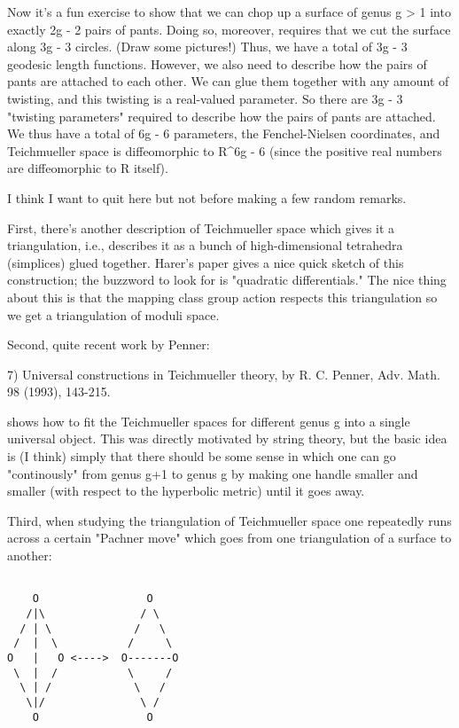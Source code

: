 Now it's a fun exercise to show that we can chop up a surface of genus g
> 1 into exactly 2g - 2 pairs of pants.  Doing so, moreover, requires
that we cut the surface along 3g - 3 circles.  (Draw some pictures!)  
Thus, we have a total of 3g - 3 geodesic length functions.  However, we
also need to describe how the pairs of pants are attached to each other.
We can glue them together with any amount of twisting, and this twisting
is a real-valued parameter.  So there are 3g - 3 "twisting parameters"
required to describe how the pairs of pants are attached.  We thus have
a total of 6g - 6 parameters, the Fenchel-Nielsen coordinates, and
Teichmueller space is diffeomorphic to R^{6g - 6} (since the positive
real numbers are diffeomorphic to R itself).  

I think I want to quit here but not before making a few random remarks.

First, there's another description of Teichmueller space which gives it
a triangulation, i.e., describes it as a bunch of high-dimensional
tetrahedra (simplices) glued together.  Harer's paper gives a nice quick
sketch of this construction; the buzzword to look for is "quadratic
differentials."  The nice thing about this is that the mapping class
group action respects this triangulation so we get a triangulation of
moduli space.  

Second, quite recent work by Penner:

7) Universal constructions in Teichmueller theory, by R. C. Penner, Adv.
Math. 98 (1993), 143-215.

shows how to fit the Teichmueller spaces for different genus g into a
single universal object.  This was directly motivated by string theory,
but the basic idea is (I think) simply that there should be some sense in which
one can go "continously" from genus g+1 to genus g by making one handle
smaller and smaller (with respect to the hyperbolic metric) until it
goes away.  

Third, when studying the triangulation of Teichmueller space one
repeatedly runs across a certain "Pachner move" which goes from one
triangulation of a surface to another:


\begin{verbatim}

    O                 O
   /|\               / \    
  / | \             /   \  
 /  |  \           /     \ 
O   |   O <---->  O-------O
 \  |  /           \     /   
  \ | /             \   /          
   \|/               \ /     
    O                 O
\end{verbatim}
    

